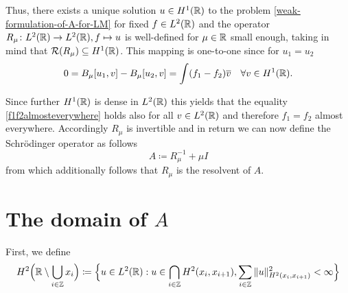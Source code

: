 Thus, there exists a unique solution $u \in H^{1}(\mathbb{R})$ to the problem \eqref{weak-formulation-of-A-for-LM} for fixed $f \in L^{2}(\mathbb{R})$ and  the operator $R_{\mu} \colon L^{2}(\mathbb{R}) \rightarrow L^{2}(\mathbb{R}), f \mapsto u$ is well-defined for $\mu \in \mathbb{R}$ small enough, taking in mind that $\mathcal{R}(R_{\mu}) \subseteq H^{1}(\mathbb{R})$. This mapping is one-to-one since for $u_{1} = u_{2}$
	\begin{equation}
		0 = B_{\mu}[u_{1}, v] - B_{\mu}[u_{2}, v]= \int (f_{1} - f_{2}) \overline{v} \quad \forall v \in H^{1}(\mathbb{R}). \label{f1f2almosteverywhere}
	\end{equation} 
	
Since further $H^{1}(\mathbb{R})$ is dense in $L^{2}(\mathbb{R})$ this yields that the equality \eqref{f1f2almosteverywhere} holds also for all $v \in L^{2}(\mathbb{R})$ and therefore $f_{1} = f_{2}$ almost everywhere. Accordingly $R_{\mu}$ is invertible and in return we can now define the Schrödinger operator as follows 
		\[ A \coloneqq R_{\mu}^{-1} + \mu I \]
from which additionally follows that $R_{\mu}$ is the resolvent of $A$.

\section{The domain of $A$}
First, we define
	\[ H^{2}\Big(\mathbb{R} \setminus \bigcup_{i \in \mathbb{Z}} x_{i} \Big) \coloneqq \Big\{ u \in L^{2}(\mathbb{R}) : u \in \bigcap_{i \in \mathbb{Z}} H^{2}(x_{i}, x_{i+1}), \sum_{i \in \mathbb{Z}} \|u\|^{2}_{H^{2}(x_{i}, x_{i+1})} < \infty \Big\} \]

